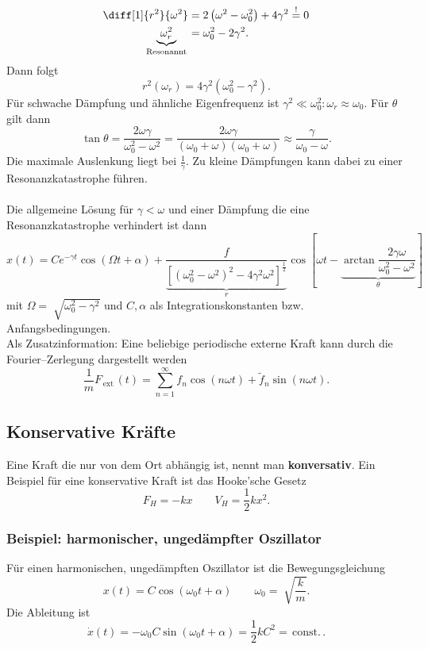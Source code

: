 \documentclass[a4paper,12pt]{article}
\numberwithin{equation}{section}
\begin{document}
\begin{align*}
        \diff[1]{r^2}{\omega ^2}&=2\left(\omega ^2-\omega _0^2\right)+4\gamma ^2\stackrel{!}{=}0\\
        \underbrace{\omega _r^2}_{\,\text{Resonannt}\,}&=\omega _0^2-2\gamma ^2
.\end{align*}
Dann folgt
\[ 
        r^2\left(\omega _r\right)=4\gamma ^2\left(\omega _0^2-\gamma ^2\right)
.\] 
Für schwache Dämpfung und ähnliche Eigenfrequenz ist $\gamma ^2\ll \omega _0^2:\omega _r \approx \omega _0$. Für $\theta $ gilt dann
\[ 
        \tan \theta =\dfrac{2\omega \gamma }{\omega _0^2-\omega ^2}=\dfrac{2\omega \gamma }{\left(\omega _0+\omega \right)\left(\omega _0+\omega \right)}\approx \dfrac{\gamma }{\omega _0-\omega }
.\] 
Die maximale Auslenkung liegt bei $\tfrac{1}{\gamma }$. Zu kleine Dämpfungen kann dabei zu einer Resonanzkatastrophe führen. \\\\\noindent
Die allgemeine Lösung für $\gamma <\omega $ und einer Dämpfung die eine Resonanzkatastrophe verhindert ist dann
\[ 
        x\left(t\right)=Ce^{-\gamma t}\cos \left(\Omega t+\alpha \right)+\dfrac{f}{\underbrace{\left[\left(\omega _0^2-\omega ^2\right)^2-4\gamma ^2\omega ^2\right]^{\tfrac{1}{2} }}_{r}}\cos \left[\omega t-\underbrace{\arctan \dfrac{2\gamma \omega }{\omega _0^2-\omega ^2}}_{\theta }\right]
\] 
mit $\Omega =\sqrt[ ]{\omega _0^2-\gamma ^2}$ und $C,\alpha $ als Integrationskonstanten bzw.\,Anfangsbedingungen.\\\indent
Als Zusatzinformation: Eine beliebige periodische externe Kraft kann durch die Fourier--Zerlegung dargestellt werden
\[ 
        \dfrac{1}{m}F_{\,\text{ext}\,}\left(t\right)=\sum_{n=1}^{\infty}f_n\cos \left(n\omega t\right)+\tilde{f}_n\sin \left(n\omega t\right)
.\] 

\subsection{Konservative Kräfte}
Eine Kraft die nur von dem Ort abhängig ist, nennt man \textbf{konversativ}. Ein Beispiel für eine konservative Kraft ist das Hooke'sche Gesetz
\[ 
        F_H=-kx\qquad V_H=\dfrac{1}{2}kx^2
.\] 
\subsubsection{Beispiel: harmonischer, ungedämpfter Oszillator}
Für einen harmonischen, ungedämpften Oszillator ist die Bewegungsgleichung
\[ 
        x(t)=C\cos \left(\omega _0t+\alpha \right)\qquad \omega _0=\sqrt[]{\dfrac{k}{m}}
.\] 
Die Ableitung ist
\[ 
        \dot{x}(t)=-\omega _0C\sin (\omega _0t+\alpha )=\dfrac{1}{2}kC^2=\,\text{const.}\,
.\] 
\end{document}
